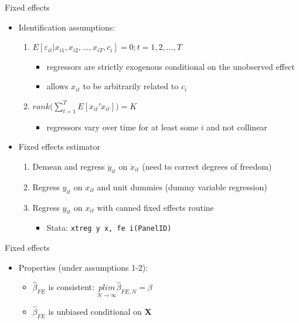 \documentclass{beamer}
\begin{document}
\begin{frame}{Fixed effects}
	
	\begin{itemize}
	\item Identification assumptions:	
		\begin{enumerate}
		\item $E[\varepsilon_{it} | x_{i1}, x_{i2}, \dots, x_{iT}, c_i]=0; t=1,2,\dots,T$
			\begin{itemize}
			\item regressors are strictly exogenous conditional on the unobserved effect
			\item allows $x_{it}$ to be arbitrarily related to $c_i$
			\end{itemize}
		\item $rank\bigg( \sum_{t=1}^T E[\ddot{x}_{it}'\ddot{x}_{it}]\bigg) = K$
			\begin{itemize}
			\item regressors vary over time for at least some $i$ and not collinear
			\end{itemize}
		\end{enumerate}
	\item Fixed effects estimator
		\begin{enumerate}
		\item Demean and regress $\ddot{y}_{it}$ on $\ddot{x}_{it}$ (need to correct degrees of freedom)
		\item Regress $y_{it}$ on $x_{it}$ and unit dummies (dummy variable regression)
		\item Regress $y_{it}$ on $x_{it}$ with canned fixed effects routine
			\begin{itemize}
			\item Stata: \texttt{xtreg y x, fe i(PanelID)}
			\end{itemize}
		\end{enumerate}
	\end{itemize}
\end{frame}


\begin{frame}{Fixed effects}

\begin{itemize}
	\item Properties (under assumptions 1-2):
		\begin{itemize}
		\item $\widehat{\beta}_{FE}$ is consistent: $\underset{N\rightarrow \infty}{plim} \widehat{\beta}_{FE,N}=\beta$
		\item $\widehat{\beta}_{FE}$ is unbiased conditional on \textbf{X}
		\end{itemize}
\end{itemize}

\end{frame}
\end{document}
